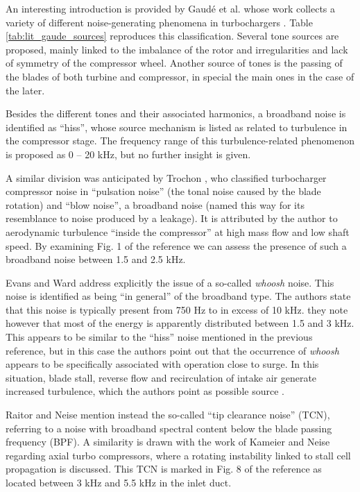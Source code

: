 An interesting introduction is provided by Gaudé et al.  whose work collects a variety of different noise-generating phenomena in turbochargers \cite{gaude2008experimental}. Table \ref{tab:lit_gaude_sources} reproduces this classification. Several tone sources are proposed, mainly linked to the imbalance of the rotor and irregularities and lack of symmetry of the compressor wheel. Another source of tones is the passing of the blades of both turbine and compressor, in special the main ones in the case of the later.

Besides the different tones and their associated harmonics, a broadband noise is identified as ``hiss'', whose source mechanism is listed as related to turbulence in the compressor stage. The frequency range of this turbulence-related phenomenon is proposed as 0 -- 20 kHz, but no further insight is given.

A similar division was anticipated by Trochon \cite{trochon2001new}, who classified turbocharger compressor noise in ``pulsation noise'' (the tonal noise caused by the blade rotation) and ``blow noise'', a broadband noise (named this way for its resemblance to noise produced by a leakage). It is attributed by the author to aerodynamic turbulence ``inside the compressor'' at high mass flow and low shaft speed. By examining Fig. 1 of the reference we can assess the presence of such a broadband noise between 1.5 and 2.5 kHz.

Evans and Ward \cite{evans2005minimizing} address explicitly the issue of a so-called \emph{whoosh} noise. This noise is identified as being ``in general'' of the broadband type. The authors state that this noise is typically present from 750 Hz to in excess of 10 kHz. they note however that most of the energy is apparently distributed between 1.5 and 3 kHz. This appears to be similar to the ``hiss'' noise mentioned in the previous reference, but in this case the authors point out that the occurrence of \emph{whoosh} appears to be specifically associated with operation close to surge. In this situation, blade stall, reverse flow and recirculation of intake air generate increased turbulence, which the authors point as possible source .

Raitor and Neise \cite{raitor2008sound} mention instead the so-called ``tip clearance noise'' (TCN), referring to a noise with broadband spectral content below the blade passing frequency (BPF). A similarity is drawn with the work of Kameier and Neise \cite{kameier1997rotating} regarding axial turbo compressors, where a rotating instability linked to stall cell propagation is discussed. This TCN is marked in Fig. 8 of the reference as located between 3 kHz and 5.5 kHz in the inlet duct. 


